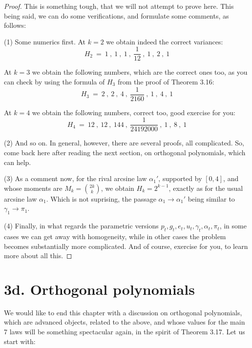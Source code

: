 \documentclass[12pt]{amsbook}
\begin{document}
\begin{proof}
This is something tough, that we will not attempt to prove here. This being said, we can do some verifications, and formulate some comments, as follows:

\medskip

(1) Some numerics first. At $k=2$ we obtain indeed the correct variances:
$$H_2\ =\ 1\ ,\ 1\ ,\ 1\ ,\ \frac{1}{12}\ ,\ 1\ ,\ 2\ ,\ 1$$

At $k=3$ we obtain the following numbers, which are the correct ones too, as you can check by using the formula of $H_3$ from the proof of Theorem 3.16:
$$H_3\ =\ 2\ ,\ 2\ ,\ 4\ ,\ \frac{1}{2160}\ ,\ 1\ ,\ 4\ ,\ 1$$

At $k=4$ we obtain the following numbers, correct too, good exercise for you:
$$H_4\ =\ 12\ ,\ 12\ ,\ 144\ ,\ \frac{1}{24192000}\ ,\ 1\ ,\ 8\ ,\ 1$$

(2) And so on. In general, however, there are several proofs, all complicated. So, come back here after reading the next section, on orthogonal polynomials, which can help.

\medskip

(3) As a comment now, for the rival arcsine law $\alpha_1'$, supported by $[0,4]$, and whose moments are $M_k=\binom{2k}{k}$, we obtain $H_k=2^{k-1}$, exactly as for the usual arcsine law $\alpha_1$. Which is not suprising, the passage $\alpha_1\to\alpha_1'$ being similar to $\gamma_1\to\pi_1$.

\medskip

(4) Finally, in what regards the parametric versions $p_t,g_t,e_t,u_t,\gamma_t,\alpha_t,\pi_t$, in some cases we can get away with homogeneity, while in other cases the problem becomes substantially more complicated. And of course, exercise for you, to learn more about all this.
\end{proof}

\section*{3d. Orthogonal polynomials} 

We would like to end this chapter with a discussion on orthogonal polynomials, which are advanced objects, related to the above, and whose values for the main 7 laws will be something spectacular again, in the spirit of Theorem 3.17. Let us start with:

\end{document}
